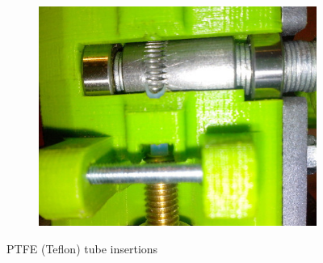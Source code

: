 \documentclass[11pt,a4paper]{article}
\begin{document}
\begin{figure}[H]
    ~ %
    \begin{subfigure}[b]{0.3\textwidth}
        \includegraphics[width=\textwidth,cfbox=azul_marcos 4pt 0pt]{FOTOS/TEFLON3}
    \end{subfigure}
    \caption*{PTFE (Teflon) tube insertions}
\end{figure}
\end{document}
